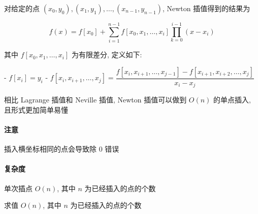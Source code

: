 对给定的点 \((x_0,y_0),(x_1,y_1),\dots,(x_{n-1},y_{n-1})\), Newton 插值得到的结果为

\[
    f(x)=f[x_0]+\sum_{i=1}^{n-1}f[x_0,x_1,\dots,x_i]\prod_{k=0}^{i-1}(x-x_i)
\]

其中 \(f[x_0,x_1,\dots,x_i]\) 为有限差分, 定义如下:

- \(f[x_i]=y_i\)
- \(f[x_i,x_{i+1},\dots,x_j]=\dfrac{f[x_i,x_{i+1},\dots,x_{j-1}]-f[x_{i+1},x_{i+2},\dots,x_j]}{x_i-x_j}\)

相比 Lagrange 插值和 Neville 插值, Newton 插值可以做到 \(O(n)\) 的单点插入, 且形式更加简单易懂

\paragraph{注意}

插入横坐标相同的点会导致除 \(0\) 错误

\paragraph{复杂度}

单次插点 \(O(n)\), 其中 \(n\) 为已经插入的点的个数

求值 \(O(n)\), 其中 \(n\) 为已经插入的点的个数
